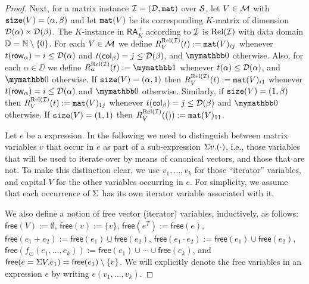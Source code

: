 \begin{proof}
Next, for a matrix instance $\mathcal{I} = (\mathcal{D},\texttt{mat})$ over $\mathcal{S}$,
let $V\in\mathcal{M}$ with $\texttt{size}(V)=(\alpha,\beta)$ and let $\texttt{mat}(V)$ be its corresponding $K$-matrix of dimension $\mathcal{D}(\alpha)\times \mathcal{D}(\beta)$.
The $K$-instance in $\mathsf{RA}_{K}^+$ according to $\mathcal{I}$ is $\text{Rel}(\mathcal{I})$ with data domain $\mathbb{D} = \mathbb{N} \setminus \{0\}$. For each $V\in\mathcal{M}$ we define 
$R_V^{\text{Rel}(\mathcal{I})}(t):=\texttt{mat}(V)_{ij}$ whenever $t(\mathsf{row}_\alpha) = i \leq \mathcal{D}(\alpha)$ and $t(\mathsf{col}_\beta) = j \leq \mathcal{D}(\beta)$, and $\kzero$ otherwise. 
Also, for each $\alpha \in \DD$ we define $R_\alpha^{\text{Rel}(\I)}(t):=\kone$ whenever $t(\alpha) \leq \mathcal{D}(\alpha)$, and $\kzero$ otherwise.
If $\texttt{size}(V)=(\alpha,1)$ then $R_V^{\text{Rel}(\mathcal{I})}(t):=\texttt{mat}(V)_{i1}$ whenever $t(\mathsf{row}_\alpha) = i \leq \mathcal{D}(\alpha)$ and $\kzero$ otherwise.
Similarly, if $\texttt{size}(V)=(1,\beta)$ then $R_V^{\text{Rel}(\mathcal{I})}(t):=\texttt{mat}(V)_{1j}$ whenever $t(\mathsf{col}_\beta) = j \leq \mathcal{D}(\beta)$ and $\kzero$ otherwise.
If $\texttt{size}(V)=(1,1)$ then $R_V^{\text{Rel}(\mathcal{I})}(()):=\texttt{mat}(V)_{11}$.


Let $e$ be a \langsum expression. In the following we need to distinguish between matrix variables $v$
that occur in $e$ as part of a sub-expression $\Sigma v. (\cdot)$, i.e., those variables that will be used to iterate over by means of canonical vectors, and those that are not. To make this distinction clear, we use $v_1,\ldots,v_k$ for those ``iterator'' variables, and capital $V$ for the other variables occurring in $e$. For simplicity, we assume that each occurrence of $\Sigma$ has its own iterator variable associated with it. 

We also define a notion of free vector (iterator) variables, inductively, as follows: $\mathsf{free}(V):=\emptyset$,
 $\mathsf{free}(v):=\{v\}$, $\mathsf{free}(e^T):=\mathsf{free}(e)$, $\mathsf{free}(e_1+e_2):=\mathsf{free}(e_1)\cup \mathsf{free}(e_2)$, $\mathsf{free}(e_1\cdot e_2):=\mathsf{free}(e_1)\cup \mathsf{free}(e_2)$,
 $\mathsf{free}(f_\odot(e_1,\ldots,e_k)):=\mathsf{free}(e_1)\cup\cdots \cup \mathsf{free}(e_k)$, and $\mathsf{free}(e=\Sigma V. e_1)=\mathsf{free}(e_1)\setminus\{v\}$. We will explicitly denote the free variables in an expression $e$ by writing $e(v_1,\ldots,v_k)$.


\end{proof}
